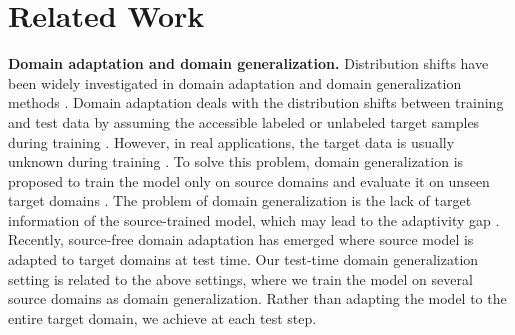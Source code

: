  \section{Related Work}


\noindent
\textbf{Domain adaptation and domain generalization.}
Distribution shifts have been widely investigated in domain adaptation \cite{long2015learning, wilson2020survey, you2019universal} and domain generalization methods \cite{arjovsky2019invariant, zhou2022domain, wang2022generalizing}.
Domain adaptation deals with the distribution shifts between training and test data by assuming the accessible labeled or unlabeled target samples during training \cite{ben2006analysis, farahani2021brief, csurka2017domain, guo2017calibration}. 
However, in real applications, the target data is usually unknown during training \cite{zhao2020domain}.
To solve this problem, domain generalization is proposed to train the model only on source domains and evaluate it on unseen target domains \cite{muandet2013domain, li2018domain, dou2019domain, gulrajani2020search, xiao2021bit, park2023test}. 
The problem of domain generalization is the lack of target information of the source-trained model, which may lead to the adaptivity gap \cite{dubey2021adaptive}.
Recently, source-free domain adaptation has emerged \cite{liang2020we, kundu2022balancing, wang2022exploring, roy2022uncertainty, fang2022source, jing2022variational, yu2023comprehensive, thopalli2023target} where source model is adapted to target domains at test time. 
Our test-time domain generalization setting is related to the above settings, where we train the model on several source domains as domain generalization. 
Rather than adapting the model to the entire target domain, we achieve  at each test step.


